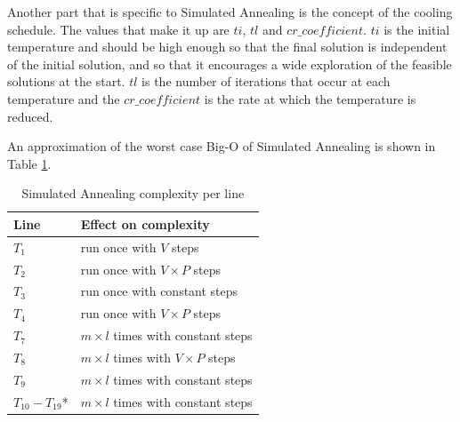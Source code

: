 \documentclass[12pt]{report}
\begin{document}
Another part that is specific to Simulated Annealing is the concept of the cooling schedule. The values that make it up are $ti$, $tl$ and $cr\_coefficient$. $ti$ is the initial temperature and should be high enough so that the final solution is independent of the initial solution, and so that it encourages a wide exploration of the feasible solutions at the start. $tl$ is the number of iterations that occur at each temperature and the $cr\_coefficient$ is the rate at which the temperature is reduced.\cite{coolingSchedule}

An approximation of the worst case Big-O of Simulated Annealing is shown in Table \ref{simLines}.

\begin{table}[H]
\centering
\caption{Simulated Annealing complexity per line}
\label{simLines}
\begin{tabular}{@{}|l|l|@{}}
\toprule
Line              & Effect on complexity                                                                                                        \\ \midrule
$T_1$             & run once with $V$ steps                                                                                                     \\ \midrule
$T_2$             & run once with $V \times P$ steps                                                                                            \\ \midrule
$T_3$             & run once with constant steps                                                                                                \\ \midrule
$T_4$             & run once with $V \times P$ steps                                                                                            \\ \midrule
$T_7$             & $m \times l$ times with constant steps                                                                                      \\ \midrule
$T_8$             & $m \times l$ times with $V \times P$ steps                                                                                  \\ \midrule
$T_9$             & $m \times l$ times with constant steps                                                                                      \\ \midrule
$T_{10} - T_{19}$* & $m \times l$ times with constant steps \\ \midrule

\end{tabular}
\end{table}
\end{document}
